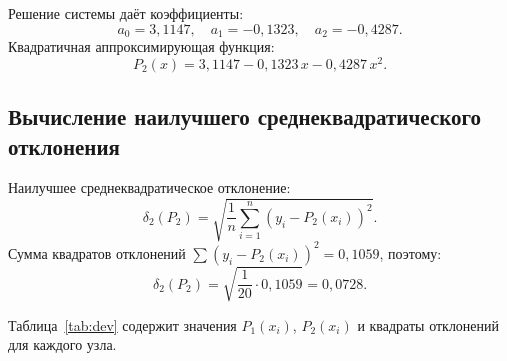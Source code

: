 \documentclass[a4paper, final]{article}
\begin{document}
Решение системы даёт коэффициенты:
\[
a_0 = 3{,}1147, \quad a_1 = -0{,}1323, \quad a_2 = -0{,}4287.
\]
Квадратичная аппроксимирующая функция:
\[
P_2(x) = 3{,}1147 - 0{,}1323\,x - 0{,}4287\,x^2.
\]

\subsection{Вычисление наилучшего среднеквадратического отклонения}

Наилучшее среднеквадратическое отклонение:
\[
\delta_2(P_2) = \sqrt{\frac{1}{n}\sum_{i=1}^{n}(y_i - P_2(x_i))^2}.
\]
Сумма квадратов отклонений $\sum(y_i - P_2(x_i))^2 = 0{,}1059$, поэтому:
\[
\delta_2(P_2) = \sqrt{\frac{1}{20} \cdot 0{,}1059} = 0{,}0728.
\]

Таблица~\ref{tab:dev} содержит значения $P_1(x_i)$, $P_2(x_i)$ и квадраты
отклонений для каждого узла.
\end{document}

